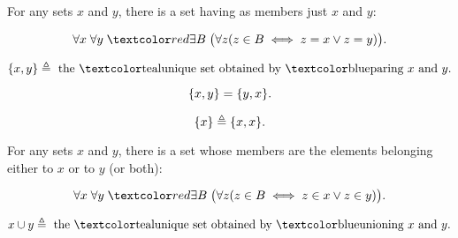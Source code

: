 
\begin{frame}{}
  \begin{axiom}
    For any sets $x$ and $y$, there is a set having as members just $x$ and $y$:

    \[
      \forall x\; \forall y\; \red{\exists B}\; \big(\forall z (z \in B \iff z = x \lor z = y)\big).
    \]
  \end{axiom}

  \pause
  \begin{definition}[``$\set{x, y}$'']
    \[
      \set{x, y} \triangleq \text{ the \teal{unique} set obtained by \blue{paring} } x \text{ and } y.
    \]
  \end{definition}

  \pause
  \begin{theorem}
    \[
      \{x, y\} = \{y, x\}.
    \]
  \end{theorem}

  \pause
  \begin{definition}[``$\set{x}$'']
    \[
      \{x\} \triangleq \{x, x\}.
    \]
  \end{definition}
\end{frame}

\begin{frame}{}
  \begin{axiom}
    For any sets $x$ and $y$, there is a set whose members are
    the elements belonging either to $x$ or to $y$ (or both):

    \[
      \forall x\; \forall y\; \red{\exists B}\; \big(\forall z (z \in B \iff z \in x \lor z \in y)\big).
    \]
  \end{axiom}

  \pause
  \begin{definition}[``$x \cup y$'']
    \[
      x \cup y \triangleq \text{ the \teal{unique} set obtained by \blue{unioning} } x \text{ and } y.
    \]
  \end{definition}
\end{frame}

